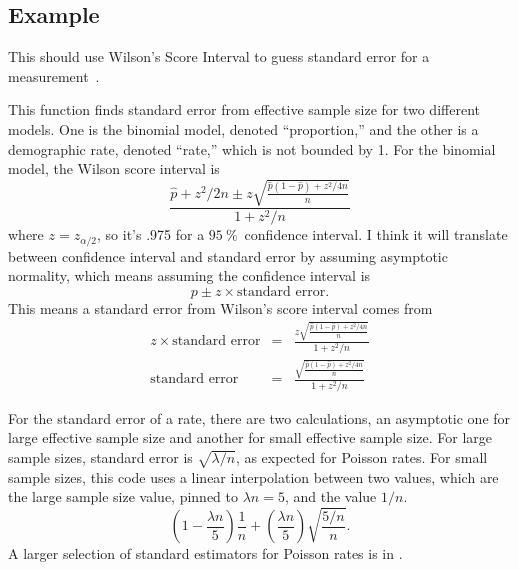 \documentclass[fleqn,10pt]{olplainarticle}
\begin{document}
\subsection{Example}
This should use Wilson's Score Interval to guess standard error for a measurement~\citep{agresti1998approximate}.

This function finds standard error from effective sample size for two
different models. One is the binomial model, denoted ``proportion,''
and the other is a demographic rate, denoted ``rate,'' which is not bounded
by 1. For the binomial model, the Wilson score interval is
\begin{equation}
    \frac{\hat{p}+z^2/2n\pm z\sqrt{\frac{\hat{p}(1-\hat{p})+z^2/4n}{n}}}{1+z^2/n}
\end{equation}
where $z=z_{\alpha/2}$, so it's .975 for a $95\:\%$~confidence interval.
I think it will translate between confidence interval and standard
error by assuming asymptotic normality, which means assuming the
confidence interval is
\begin{equation}
    p\pm z \times\mbox{standard error}.
\end{equation}
This means a standard error from Wilson's score interval comes from
\begin{eqnarray}
    z \times\mbox{standard error} & = & \frac{z\sqrt{\frac{\hat{p}(1-\hat{p})+z^2/4n}{n}}}{1+z^2/n} \\
    \mbox{standard error} & = & \frac{\sqrt{\frac{\hat{p}(1-\hat{p})+z^2/4n}{n}}}{1+z^2/n}
\end{eqnarray}

For the standard error of a rate, there are two calculations, an asymptotic one
for large effective sample size and another for small effective sample size.
For large sample sizes, standard error is $\sqrt{\lambda/n}$, as expected for Poisson
rates. For small sample sizes, this code uses a linear interpolation between two values,
which are the large sample size value, pinned to $\lambda n=5$, and the value $1/n$.
\begin{equation}
    \left(1-\frac{\lambda n}{5}\right) \frac{1}{n} + \left(\frac{\lambda n}{5}\right)\sqrt{\frac{5/n}{n}}.
\end{equation}
A larger selection of standard estimators for Poisson rates is in \citet{patil2012}.
\end{document}
